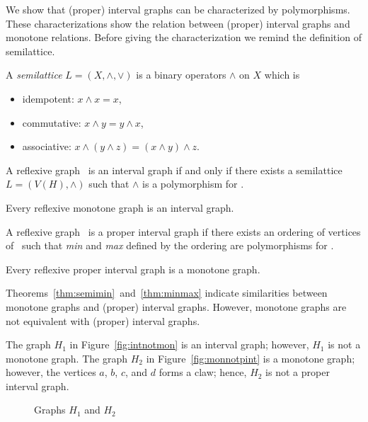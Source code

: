 We show that (proper) interval graphs can be characterized by polymorphisms. 
These characterizations show the relation between (proper) interval graphs and monotone relations. 
Before giving the characterization we remind the definition of semilattice.

\begin{defi} [Semilattice]
A \emph{semilattice} \(L=(X,\wedge,\vee)\) is a binary operators \(\wedge\) on \(X\) which is
\begin{itemize}
\item idempotent: \(x \wedge x = x\),
\item commutative: \(x \wedge y = y \wedge x\),
\item associative: \(x \wedge (y \wedge z) = (x \wedge y) \wedge z\).
\end{itemize}
\end{defi}

\begin{theorem}[TODO] \label{thm:semimin}
A reflexive graph \mH\ is an interval graph if and only if there exists
a semilattice \(L=(V(H), \wedge)\) such that \(\wedge\) is a polymorphism for \mH\@.
\end{theorem}

\begin{cor} \label{cor:intmon}
Every reflexive monotone graph is an interval graph.
\end{cor}

\begin{theorem} [TODO] \label{thm:minmax}
A reflexive graph \mH\ is a proper interval graph if there exists an ordering of 
vertices of \mH\ such that \emph{min} and \emph{max} defined by the ordering are
polymorphisms for \mH\@.
\end{theorem}

\begin{cor} \label{cor:pintmon}
Every reflexive proper interval graph is a monotone graph.
\end{cor}

Theorems~\ref{thm:semimin}~and~\ref{thm:minmax} indicate similarities between
monotone graphs and (proper) interval graphs. However, monotone graphs are not
equivalent with (proper) interval graphs.

\begin{example} \label{exm:diff}
The graph \(H_1\) in Figure~\ref{fig:intnotmon} is 
an interval graph; however, \(H_1\) is not a monotone graph.
The graph \(H_2\) in Figure~\ref{fig:monnotpint} is a monotone graph;
however, the vertices \(a\), \(b\), \(c\), and \(d\) forms a claw; hence,
\(H_2\) is not a proper interval graph. 

\begin{figure}[h]
\hfill
\subfigure[\ensuremath{H_1}]{\label{fig:intnotmon}}\hfill 
\subfigure[\ensuremath{H_2}]{\label{fig:monnotpint}}\hfill 
\caption{Graphs \ensuremath{H_1} and \ensuremath{H_2}}
\end{figure}
\end{example}


